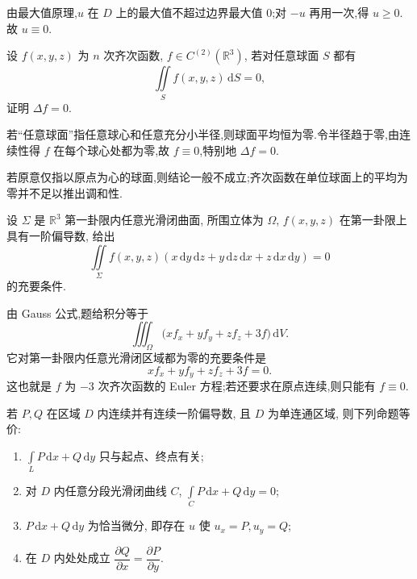 \begin{solution}
    由最大值原理,$u$ 在 $D$ 上的最大值不超过边界最大值 $0$;对 $-u$ 再用一次,得 $u\geq0$.故 $u\equiv0$.
\end{solution}

\begin{example}
    设 $f(x,y,z)$ 为 $n$ 次齐次函数, $f\in C^{(2)}(\mathbb{R}^3)$, 若对任意球面 $S$ 都有
    \[
        \iint\limits_Sf(x,y,z)\,\mathrm{d}S=0,
    \]
    证明 $\Delta f=0$.
\end{example}
\exampleblank

\begin{solution}
    若“任意球面”指任意球心和任意充分小半径,则球面平均恒为零.令半径趋于零,由连续性得 $f$ 在每个球心处都为零,故 $f\equiv0$,特别地 $\Delta f=0$.

    若原意仅指以原点为心的球面,则结论一般不成立;齐次函数在单位球面上的平均为零并不足以推出调和性.
\end{solution}

\begin{example}
    设 $\Sigma$ 是 $\mathbb{R}^3$ 第一卦限内任意光滑闭曲面, 所围立体为 $\Omega$, $f(x,y,z)$ 在第一卦限上具有一阶偏导数, 给出
    \[
        \iint\limits_\Sigma f(x,y,z)(x\,\mathrm{d}y\,\mathrm{d}z+y\,\mathrm{d}z\,\mathrm{d}x+z\,\mathrm{d}x\,\mathrm{d}y)=0
    \]
    的充要条件.
\end{example}
\exampleblank

\begin{solution}
    由 Gauss 公式,题给积分等于
    \[
        \iiint_\Omega\bigl(xf_x+yf_y+zf_z+3f\bigr)\,\mathrm{d}V.
    \]
    它对第一卦限内任意光滑闭区域都为零的充要条件是
    \[
        xf_x+yf_y+zf_z+3f=0.
    \]
    这也就是 $f$ 为 $-3$ 次齐次函数的 Euler 方程;若还要求在原点连续,则只能有 $f\equiv0$.
\end{solution}




\begin{theorem}[\markstar]
    若 $P,Q$ 在区域 $D$ 内连续并有连续一阶偏导数, 且 $D$ 为单连通区域, 则下列命题等价:
    \begin{enumerate}
        \item $\displaystyle\int\limits_LP\,\mathrm{d}x+Q\,\mathrm{d}y$ 只与起点、终点有关;
        \item 对 $D$ 内任意分段光滑闭曲线 $C$, $\displaystyle\int\limits_CP\,\mathrm{d}x+Q\,\mathrm{d}y=0$;
        \item $P\,\mathrm{d}x+Q\,\mathrm{d}y$ 为恰当微分, 即存在 $u$ 使 $u_x=P,u_y=Q$;
        \item 在 $D$ 内处处成立 $\dfrac{\partial Q}{\partial x}=\dfrac{\partial P}{\partial y}$.
    \end{enumerate}
\end{theorem}

